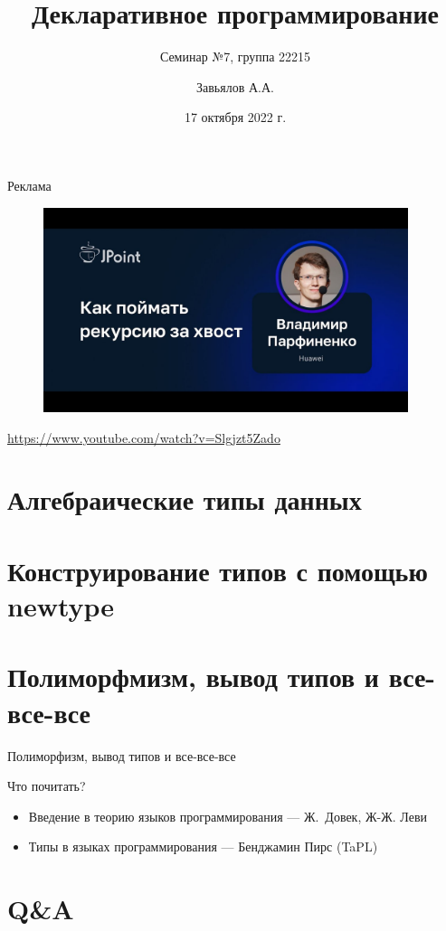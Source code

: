 \documentclass{beamer}
\title{Декларативное программирование}
\subtitle{Семинар №7, группа 22215}
\author{Завьялов А.А.}
\date{17 октября 2022 г.}
\institute{Кафедра систем информатики ФИТ НГУ}
\begin{document}
  \maketitle
  \begin{frame}{Реклама}
    \begin{figure}
        \centering
        \includegraphics[width=0.95\textwidth]{media/tail-recursion.jpg}
    \end{figure}
    \begin{center}\url{https://www.youtube.com/watch?v=Slgjzt5Zado}\end{center}
  \end{frame}
  \section{Алгебраические типы данных}
  \section{Конструирование типов с помощью newtype}
  \section{Полиморфмизм, вывод типов и все-все-все}
  \begin{frame}{Полиморфизм, вывод типов и все-все-все}
      \begin{block}{Что почитать?}
      \begin{itemize}
          \item Введение в теорию языков программирования --- Ж.~Довек, Ж-Ж. Леви
          \item Типы в языках программирования --- Бенджамин Пирс (TaPL)
      \end{itemize}
      \end{block}
  \end{frame}
  \section{Q\&A}
\end{document}
